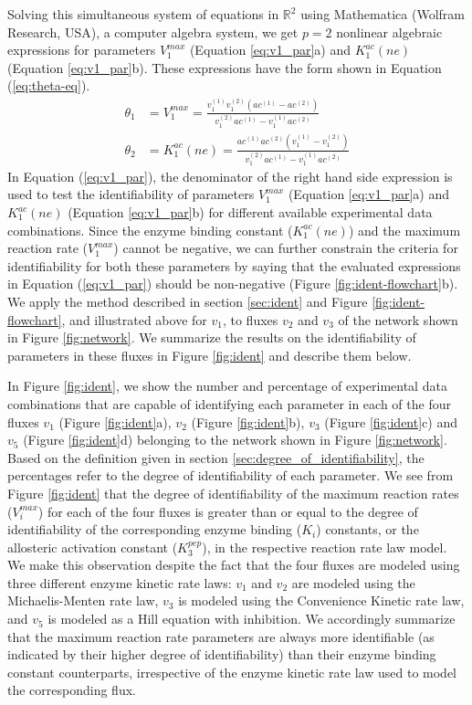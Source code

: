 \documentclass[10pt]{article}
\begin{document}
	Solving this simultaneous system of equations in $\mathbb{R}^2$ using Mathematica (Wolfram Research, USA), a computer algebra system, we get $p=2$ nonlinear algebraic expressions for parameters $V_1^{max}$ (Equation \ref{eq:v1_par}a) and $K_1^{ac}(ne)$ (Equation \ref{eq:v1_par}b). These expressions have the form shown in Equation (\ref{eq:theta-eq}).
	\begin{subequations}\label{eq:v1_par}
		\begin{align}		
		\theta_1 &= V_1^{max} = \frac{v_1^{(1)}v_1^{(2)}(ac^{(1)}-ac^{(2)})}{v_1^{(2)}ac^{(1)}-v_1^{(1)}ac^{(2)}}\\
		\theta_2 &= K_1^{ac}(ne) = \frac{ac^{(1)}ac^{(2)}(v_1^{(1)}-v_1^{(2)})}{v_1^{(2)}ac^{(1)}-v_1^{(1)}ac^{(2)}}
		\end{align}
	\end{subequations}
	In Equation (\ref{eq:v1_par}), the denominator of the right hand side expression is used to test the identifiability of parameters $V_1^{max}$ (Equation \ref{eq:v1_par}a) and $K_1^{ac}(ne)$ (Equation \ref{eq:v1_par}b) for different available experimental data combinations. Since the enzyme binding constant ($K_1^{ac}(ne)$) and the maximum reaction rate ($V_1^{max}$) cannot be negative, we can further constrain the criteria for identifiability for both these parameters by saying that the evaluated expressions in Equation (\ref{eq:v1_par}) should be non-negative (Figure \ref{fig:ident-flowchart}b). We apply the method described in section \ref{sec:ident} and Figure \ref{fig:ident-flowchart}, and illustrated above for $v_1$, to fluxes $v_2$ and $v_3$ of the network shown in Figure \ref{fig:network}. We summarize the results on the identifiability of parameters in these fluxes in Figure \ref{fig:ident} and describe them below.
	
	In Figure \ref{fig:ident}, we show the number and percentage of experimental data combinations that are capable of identifying each parameter in each of the four fluxes $v_1$ (Figure \ref{fig:ident}a), $v_2$ (Figure \ref{fig:ident}b), $v_3$ (Figure \ref{fig:ident}c) and $v_5$ (Figure \ref{fig:ident}d) belonging to the network shown in Figure \ref{fig:network}. Based on the definition given in section \ref{sec:degree_of_identifiability}, the percentages refer to the degree of identifiability of each parameter. We see from Figure \ref{fig:ident} that the degree of identifiability of the maximum reaction rates ($V_i^{max}$) for each of the four fluxes is greater than or equal to the degree of identifiability of the corresponding enzyme binding ($K_i$) constants, or the allosteric activation constant ($K_3^{pep}$), in the respective reaction rate law model. We make this observation despite the fact that the four fluxes are modeled using three different enzyme kinetic rate laws: $v_1$ and $v_2$ are modeled using the Michaelis-Menten rate law, $v_3$ is modeled using the Convenience Kinetic rate law, and $v_5$ is modeled as a Hill equation with inhibition. We accordingly summarize that the maximum reaction rate parameters are always more identifiable (as indicated by their higher degree of identifiability) than their enzyme binding constant counterparts, irrespective of the enzyme kinetic rate law used to model the corresponding flux.
	
\end{document}
